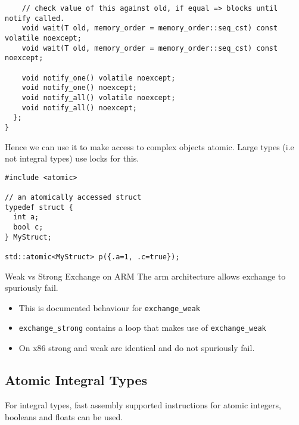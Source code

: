 \begin{verbatim}
    // check value of this against old, if equal => blocks until notify called.
    void wait(T old, memory_order = memory_order::seq_cst) const volatile noexcept;
    void wait(T old, memory_order = memory_order::seq_cst) const noexcept;

    void notify_one() volatile noexcept;
    void notify_one() noexcept;
    void notify_all() volatile noexcept;
    void notify_all() noexcept;
  };
}
\end{verbatim}
Hence we can use it to make access to complex objects atomic. Large types (i.e not integral types) use locks for this.
\begin{verbatim}
#include <atomic>

// an atomically accessed struct
typedef struct {
  int a;
  bool c;
} MyStruct;

std::atomic<MyStruct> p({.a=1, .c=true});
\end{verbatim}
\begin{sidenotebox}{Weak vs Strong Exchange on ARM}
	The arm architecture allows exchange to spuriously fail.
	\begin{itemize}
		\item This is documented behaviour for \texttt{exchange_weak}
		\item \texttt{exchange_strong} contains a loop that makes use of \texttt{exchange_weak}
		\item On x86 strong and weak are identical and do not spuriously fail.
	\end{itemize}
\end{sidenotebox}
\subsection{Atomic Integral Types}
For integral types, fast assembly supported instructions for atomic integers, booleans and floats can be used.

